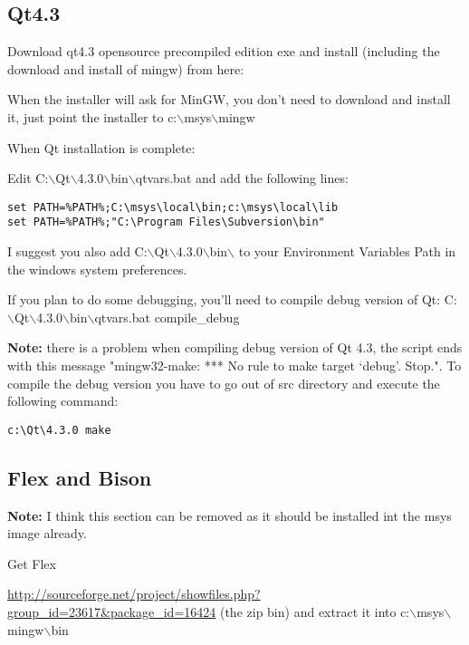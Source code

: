 \subsection{Qt4.3}
Download qt4.3 opensource precompiled edition exe and install (including the
download and install of mingw) from here:


When the installer will ask for MinGW, you don't need to download and install
it, just point the installer to c:$\backslash$msys$\backslash$mingw

When Qt installation is complete:

Edit C:$\backslash$Qt$\backslash$4.3.0$\backslash$bin$\backslash$qtvars.bat and add the following lines:

\begin{verbatim}
set PATH=%PATH%;C:\msys\local\bin;c:\msys\local\lib 
set PATH=%PATH%;"C:\Program Files\Subversion\bin" 
\end{verbatim}

I suggest you also add C:$\backslash$Qt$\backslash$4.3.0$\backslash$bin$\backslash$ to your Environment Variables Path in
the windows system preferences.

If you plan to do some debugging, you'll need to compile debug version of Qt:
C:$\backslash$Qt$\backslash$4.3.0$\backslash$bin$\backslash$qtvars.bat compile\_debug

\textbf{Note:} there is a problem when compiling debug version of Qt 4.3, the script ends with
this message  "mingw32-make: *** No rule to make target `debug'.  Stop.". To 
compile the debug version you have to go out of src directory and execute the
following command:

\begin{verbatim}
c:\Qt\4.3.0 make 
\end{verbatim}

\subsection{Flex and Bison}
\textbf{Note:} I think this section can be removed as it should be installed int the msys image already.

Get Flex

\url{http://sourceforge.net/project/showfiles.php?group\_id=23617&package\_id=16424} (the zip bin) and extract it into c:$\backslash$msys$\backslash$mingw$\backslash$bin


